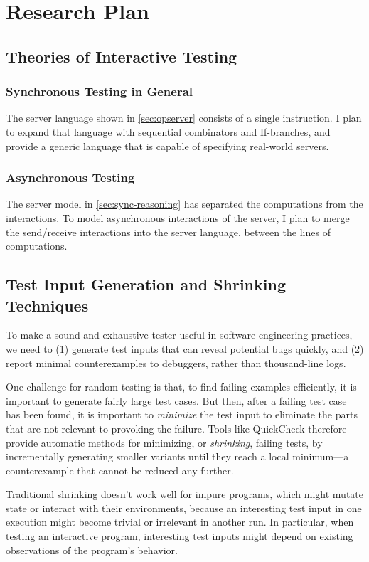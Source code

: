 \documentclass{article}
\theoremstyle{definition}
\begin{document}
\section{Research Plan}

\subsection{Theories of Interactive Testing}

\subsubsection{Synchronous Testing in General}
The server language shown in \autoref{sec:opserver} consists of a single
instruction.  I plan to expand that language with sequential combinators and
If-branches, and provide a generic language that is capable of specifying
real-world servers.
\subsubsection{Asynchronous Testing}
The server model in \autoref{sec:sync-reasoning} has separated the computations
from the interactions.  To model asynchronous interactions of the server, I plan
to merge the send/receive interactions into the server language, between the
lines of computations.

\subsection{Test Input Generation and Shrinking Techniques}
\label{sec:harness}
To make a sound and exhaustive tester useful in software engineering practices,
we need to (1) generate test inputs that can reveal potential bugs quickly, and
(2) report minimal counterexamples to debuggers, rather than thousand-line logs.

One challenge for random testing is that, to find failing examples efficiently,
it is important to generate fairly large test cases.  But then, after a failing
test case has been found, it is important to \textit{minimize} the test input to
eliminate the parts that are not relevant to provoking the failure.  Tools like
QuickCheck therefore provide automatic methods for minimizing, or {\em
  shrinking}, failing tests, by incrementally generating smaller variants until
they reach a local minimum---a counterexample that cannot be reduced any
further.

Traditional shrinking doesn't work well for impure programs, which might mutate
state or interact with their environments, because an interesting test input in
one execution might become trivial or irrelevant in another run.  In particular,
when testing an interactive program, interesting test inputs might depend on
existing observations of the program's behavior.
\end{document}
